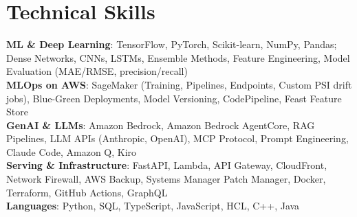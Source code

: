 \section{\textbf{Technical Skills}}
\vspace{-2pt}
\begin{itemize}[leftmargin=0.05in, label={}]
    \small{\item{
     \textbf{ML \& Deep Learning}{: TensorFlow, PyTorch, Scikit-learn, NumPy, Pandas; Dense Networks, CNNs, LSTMs, Ensemble Methods, Feature Engineering, Model Evaluation (MAE/RMSE, precision/recall)} \\
     \textbf{MLOps on AWS}{: SageMaker (Training, Pipelines, Endpoints, Custom PSI drift jobs), Blue-Green Deployments, Model Versioning, CodePipeline, Feast Feature Store} \\
     \textbf{GenAI \& LLMs}{: Amazon Bedrock, Amazon Bedrock AgentCore, RAG Pipelines, LLM APIs (Anthropic, OpenAI), MCP Protocol, Prompt Engineering, Claude Code, Amazon Q, Kiro} \\
     \textbf{Serving \& Infrastructure}{: FastAPI, Lambda, API Gateway, CloudFront, Network Firewall, AWS Backup, Systems Manager Patch Manager, Docker, Terraform, GitHub Actions, GraphQL} \\
     \textbf{Languages}{: Python, SQL, TypeScript, JavaScript, HCL, C++, Java}
    }}
\end{itemize}
\vspace{-2mm}
